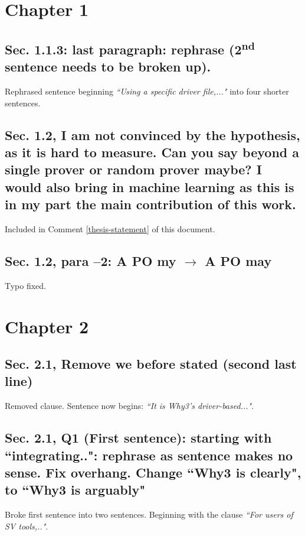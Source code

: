 \documentclass[]{article}
\newcommand{\ts}{\textsuperscript}
\begin{document}
\section{Chapter 1}

\subsection{Sec. 1.1.3: last paragraph: rephrase (2\ts{nd} sentence needs to be broken up).}

Rephrased sentence beginning \emph{``Using a specific driver file,..."} into four shorter sentences.

\subsection{Sec. 1.2, I am not convinced by the hypothesis, as it is hard to measure. Can you say beyond a single prover or random prover maybe? I would also bring in machine learning as this is in my part the main contribution of this work.}

Included in Comment \ref{thesis-statement} of this document.

\subsection{Sec. 1.2, para –2: A PO my $\rightarrow$ A PO may}

Typo fixed.

\section{Chapter 2}

\subsection{Sec. 2.1, Remove we before stated (second last line)}

Removed clause. Sentence now begins: \emph{``It is \textsf{Why3}'s driver-based..."}.

\subsection{Sec. 2.1, Q1 (First sentence): starting with ``integrating..": rephrase as sentence makes no sense. Fix overhang. Change ``Why3 is clearly", to ``Why3 is arguably"}

Broke first sentence into two sentences. Beginning with the clause \emph{``For users of SV tools,.."}.
\end{document}
